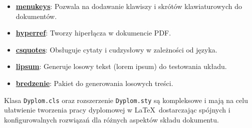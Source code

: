 \begin{itemize}
\item \href{https://www.ctan.org/pkg/menukeys}{\textbf{menukeys}}: Pozwala na dodawanie klawiszy i skrótów klawiaturowych do dokumentów.
\item \href{https://www.ctan.org/pkg/hyperref}{\textbf{hyperref}}: Tworzy hiperłącza w dokumencie PDF.
\item \href{https://www.ctan.org/pkg/csquotes}{\textbf{csquotes}}: Obsługuje cytaty i cudzysłowy w zależności od języka.
\item \href{https://www.ctan.org/pkg/lipsum}{\textbf{lipsum}}: Generuje losowy tekst (lorem ipsum) do testowania układu.
\item \href{https://www.ctan.org/pkg/bredzenie}{\textbf{bredzenie}}: Pakiet do generowania losowych treści.
\end{itemize}
Klasa \texttt{Dyplom.cls} oraz rozszerzenie \texttt{Dyplom.sty} są kompleksowe i mają na celu ułatwienie tworzenia pracy dyplomowej w \LaTeX\, dostarczając spójnych i konfigurowalnych rozwiązań dla różnych aspektów składu dokumentu.